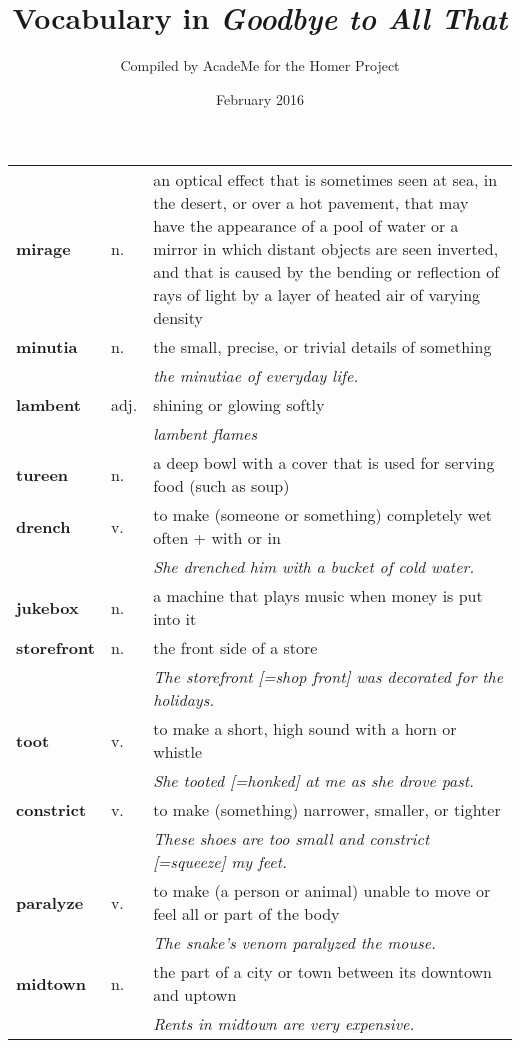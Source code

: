 \documentclass[a4paper]{article}
\title{Vocabulary in \textit{Goodbye to All That}}
\author{Compiled by AcadeMe for the Homer Project}
\date{February 2016}
\begin{document}
\maketitle
\begin{longtable}{llp{12cm}}
\textbf{mirage} & n. &  an optical effect that is sometimes seen at sea, in the desert, or over a hot pavement, that may have the appearance of a pool of water or a mirror in which distant objects are seen inverted, and that is caused by the bending or reflection of rays of light by a layer of heated air of varying density\\[0.08cm]
\textbf{minutia} & n. &  the small, precise, or trivial details of something\\
 & & \textit{the minutiae of everyday life.}\\[0.08cm]
\textbf{lambent} & adj. &  shining or glowing softly \\
 & & \textit{lambent flames}\\[0.08cm]
\textbf{tureen} & n. &  a deep bowl with a cover that is used for serving food (such as soup)\\[0.08cm]
\textbf{drench} & v. &  to make (someone or something) completely wet often + with or in \\
 & & \textit{She drenched him with a bucket of cold water.}\\[0.08cm]
\textbf{jukebox} & n. &  a machine that plays music when money is put into it\\[0.08cm]
\textbf{storefront} & n. &  the front side of a store \\
 & & \textit{The storefront [=shop front] was decorated for the holidays.}\\[0.08cm]
\textbf{toot} & v. &  to make a short, high sound with a horn or whistle \\
 & & \textit{She tooted [=honked] at me as she drove past.}\\[0.08cm]
\textbf{constrict} & v. &  to make (something) narrower, smaller, or tighter \\
 & & \textit{These shoes are too small and constrict [=squeeze] my feet.}\\[0.08cm]
\textbf{paralyze} & v. &  to make (a person or animal) unable to move or feel all or part of the body \\
 & & \textit{The snake's venom paralyzed the mouse.}\\[0.08cm]
\textbf{midtown} & n. &  the part of a city or town between its downtown and uptown \\
 & & \textit{Rents in midtown are very expensive.}\\[0.08cm]

\end{longtable}
\end{document}
